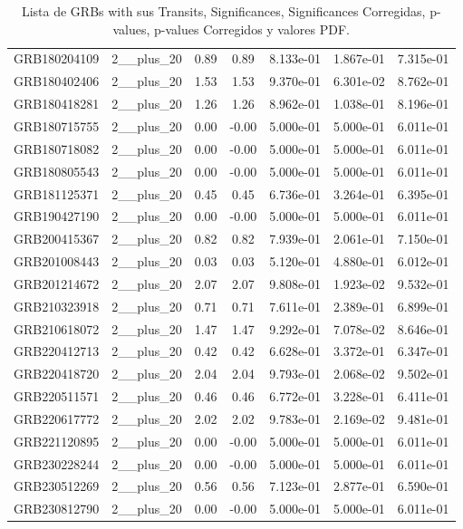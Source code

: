 \documentclass[12pt]{article}
\begin{document}
\begin{table}[h!]
{\begin{tabular}{l c c c c c c}
GRB180204109 & 2__plus_20 & 0.89 & 0.89 & 8.133e-01 & 1.867e-01 & 7.315e-01 \\
GRB180402406 & 2__plus_20 & 1.53 & 1.53 & 9.370e-01 & 6.301e-02 & 8.762e-01 \\
GRB180418281 & 2__plus_20 & 1.26 & 1.26 & 8.962e-01 & 1.038e-01 & 8.196e-01 \\
GRB180715755 & 2__plus_20 & 0.00 & -0.00 & 5.000e-01 & 5.000e-01 & 6.011e-01 \\
GRB180718082 & 2__plus_20 & 0.00 & -0.00 & 5.000e-01 & 5.000e-01 & 6.011e-01 \\
GRB180805543 & 2__plus_20 & 0.00 & -0.00 & 5.000e-01 & 5.000e-01 & 6.011e-01 \\
GRB181125371 & 2__plus_20 & 0.45 & 0.45 & 6.736e-01 & 3.264e-01 & 6.395e-01 \\
GRB190427190 & 2__plus_20 & 0.00 & -0.00 & 5.000e-01 & 5.000e-01 & 6.011e-01 \\
GRB200415367 & 2__plus_20 & 0.82 & 0.82 & 7.939e-01 & 2.061e-01 & 7.150e-01 \\
GRB201008443 & 2__plus_20 & 0.03 & 0.03 & 5.120e-01 & 4.880e-01 & 6.012e-01 \\
GRB201214672 & 2__plus_20 & 2.07 & 2.07 & 9.808e-01 & 1.923e-02 & 9.532e-01 \\
GRB210323918 & 2__plus_20 & 0.71 & 0.71 & 7.611e-01 & 2.389e-01 & 6.899e-01 \\
GRB210618072 & 2__plus_20 & 1.47 & 1.47 & 9.292e-01 & 7.078e-02 & 8.646e-01 \\
GRB220412713 & 2__plus_20 & 0.42 & 0.42 & 6.628e-01 & 3.372e-01 & 6.347e-01 \\
GRB220418720 & 2__plus_20 & 2.04 & 2.04 & 9.793e-01 & 2.068e-02 & 9.502e-01 \\
GRB220511571 & 2__plus_20 & 0.46 & 0.46 & 6.772e-01 & 3.228e-01 & 6.411e-01 \\
GRB220617772 & 2__plus_20 & 2.02 & 2.02 & 9.783e-01 & 2.169e-02 & 9.481e-01 \\
GRB221120895 & 2__plus_20 & 0.00 & -0.00 & 5.000e-01 & 5.000e-01 & 6.011e-01 \\
GRB230228244 & 2__plus_20 & 0.00 & -0.00 & 5.000e-01 & 5.000e-01 & 6.011e-01 \\
GRB230512269 & 2__plus_20 & 0.56 & 0.56 & 7.123e-01 & 2.877e-01 & 6.590e-01 \\
GRB230812790 & 2__plus_20 & 0.00 & -0.00 & 5.000e-01 & 5.000e-01 & 6.011e-01 \\
\bottomrule
\end{tabular}%
}
\caption{Lista de GRBs with sus Transits, Significances, Significances Corregidas, p-values, p-values Corregidos y valores PDF.}
\end{table}
\end{document}
